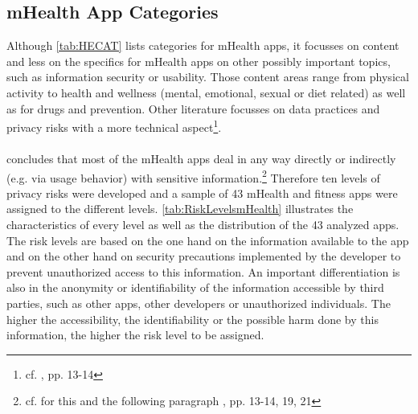 \subsection{mHealth App Categories}
Although \ref{tab:HECAT} lists categories for mHealth apps, it focusses on content and less on the specifics for mHealth apps on other possibly important topics, such as information security or usability. Those content areas range from physical activity to health and wellness (mental, emotional, sexual or diet related) as well as for drugs and prevention. Other literature focusses on data practices and privacy risks with a more technical aspect\footnote{cf. \cite{Njie.2013}, pp. 13-14}.
\\
\\
\cite{Njie.2013} concludes that most of the mHealth apps deal in any way directly or indirectly (e.g. via usage behavior) with sensitive information.\footnote{cf. for this and the following paragraph \cite{Njie.2013}, pp. 13-14, 19, 21} Therefore ten levels of privacy risks were developed and a sample of 43 mHealth and fitness apps were assigned to the different levels. \ref{tab:RiskLevelsmHealth} illustrates the characteristics of every level as well as the distribution of the 43 analyzed apps. 
\\
The risk levels are based on the one hand on the information available to the app and on the other hand on security precautions implemented by the developer to prevent unauthorized access to this information. An important differentiation is also in the anonymity or identifiability of the information accessible by third parties, such as other apps, other developers or unauthorized individuals. The higher the accessibility, the identifiability or the possible harm done by this information, the higher the risk level to be assigned.
